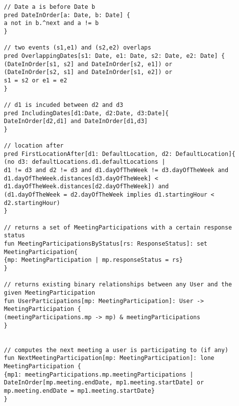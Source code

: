 \begin{lstlisting}[style=alloy]
// Date a is before Date b
pred DateInOrder[a: Date, b: Date] {
a not in b.^next and a != b
}

// two events (s1,e1) and (s2,e2) overlaps
pred OverlappingDates[s1: Date, e1: Date, s2: Date, e2: Date] {
(DateInOrder[s1, s2] and DateInOrder[s2, e1]) or
(DateInOrder[s2, s1] and DateInOrder[s1, e2]) or
s1 = s2 or e1 = e2
}

// d1 is incuded between d2 and d3
pred IncludingDates[d1:Date, d2:Date, d3:Date]{
DateInOrder[d2,d1] and DateInOrder[d1,d3]
}

// location after
pred FirstLocationAfter[d1: DefaultLocation, d2: DefaultLocation]{
(no d3: defaultLocations.d1.defaultLocations | 
d1 != d3 and d2 != d3 and d1.dayOfTheWeek != d3.dayOfTheWeek and 
d1.dayOfTheWeek.distances[d3.dayOfTheWeek] < d1.dayOfTheWeek.distances[d2.dayOfTheWeek]) and
(d1.dayOfTheWeek = d2.dayOfTheWeek implies d1.startingHour < d2.startingHour)
}

// returns a set of MeetingParticipations with a certain response status
fun MeetingParticipationsByStatus[rs: ResponseStatus]: set MeetingParticipation{
{mp: MeetingParticipation | mp.responseStatus = rs}
}

// returns existing binary relationships between any User and the given MeetingParticipation
fun UserParticipations[mp: MeetingParticipation]: User -> MeetingParticipation {
(meetingParticipations.mp -> mp) & meetingParticipations
}


// computes the next meeting a user is participating to (if any)
fun NextMeetingParticipation[mp: MeetingParticipation]: lone MeetingParticipation {
{mp1: meetingParticipations.mp.meetingParticipations | 
DateInOrder[mp.meeting.endDate, mp1.meeting.startDate] or mp.meeting.endDate = mp1.meeting.startDate}
}
\end{lstlisting}